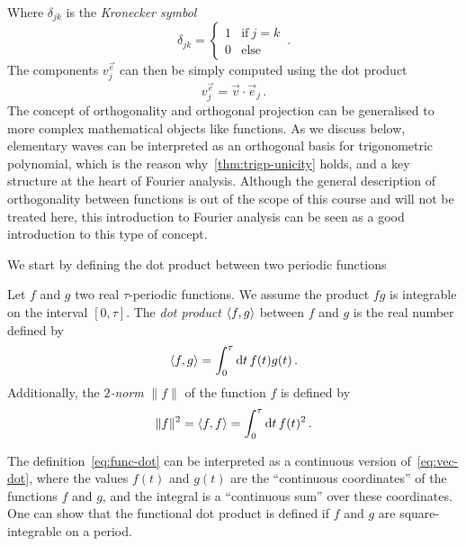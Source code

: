 Where $\delta_{jk}$ is the \emph{Kronecker symbol}
\begin{equation}
  \label{eq:kronecker}
  \delta_{jk}=
  \begin{cases}
    1&\text{if}~j=k\\
    0&\text{else}
  \end{cases}\,.
\end{equation}
The components $v^{\vec{e}}_j$ can then be simply computed using the dot product
\begin{equation}
  v^{\vec{e}}_j=\vec{v}\cdot \vec{e}_j\,.\label{eq:basis-proj}
\end{equation}
The concept of orthogonality and orthogonal projection can be generalised to more complex
mathematical objects like functions. As we discuss below, elementary waves can be
interpreted as an orthogonal basis for trigonometric polynomial, which is the reason
why~\cref{thm:trigp-unicity} holds, and a key structure at the heart of Fourier analysis.
Although the general description of orthogonality between functions is out of the scope of
this course and will not be treated here, this introduction to Fourier analysis can be
seen as a good introduction to this type of concept.

We start by defining the dot product between two periodic functions
\begin{definition}
  \label{def:func-dot}
  Let $f$ and $g$ two real $\tau$-periodic functions. We assume the product $fg$ is
  integrable on the interval $[0,\tau]$. The \emph{dot product} $\braket{f,g}$ between $f$
  and $g$ is the real number defined by
  \begin{equation}
    \braket{f,g}=\int_{0}^{\tau}\mathrm{d} t\, f(t)g(t)\,.\label{eq:func-dot}
  \end{equation}
  Additionally, the \emph{$2$-norm} $\|f\|$ of the function $f$ is defined by
  \begin{equation}
    \|f\|^2=\braket{f,f}=\int_{0}^{\tau}\mathrm{d} t\, f(t)^2\,.
  \end{equation}
\end{definition}
The definition~\cref{eq:func-dot} can be interpreted as a continuous version
of~\cref{eq:vec-dot}, where the values $f(t)$ and $g(t)$ are the ``continuous
coordinates'' of the functions $f$ and $g$, and the integral is a ``continuous sum'' over
these coordinates. One can show that the functional dot product is defined if $f$ and $g$
are square-integrable on a period.

